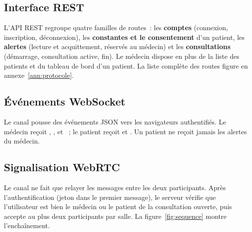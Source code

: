 \subsection{Interface REST}

L'\ac{API} \ac{REST} regroupe quatre familles de routes~: les \textbf{comptes} (connexion, inscription, déconnexion), les \textbf{constantes et le consentement} d'un patient, les \textbf{alertes} (lecture et acquittement, réservés au médecin) et les \textbf{consultations} (démarrage, consultation active, fin). Le médecin dispose en plus de la liste des patients et du tableau de bord d'un patient. La liste complète des routes figure en annexe~\ref{ann:protocole}.

\subsection{Événements WebSocket}

Le canal  pousse des événements JSON vers les navigateurs authentifiés. Le médecin reçoit , ,  et ~; le patient reçoit  et . Un patient ne reçoit jamais les alertes du médecin.

\subsection{Signalisation WebRTC}

Le canal  ne fait que relayer les messages entre les deux participants. Après l'authentification (jeton dans le premier message), le serveur vérifie que l'utilisateur est bien le médecin ou le patient de la consultation ouverte, puis accepte au plus deux participants par salle. La figure~\ref{fig:sequence} montre l'enchaînement.

